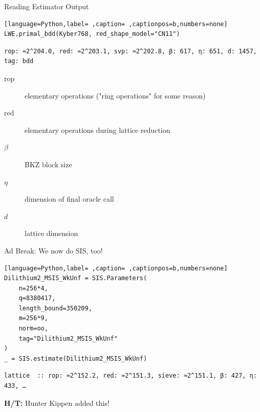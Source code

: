 \documentclass[table,10pt,aspectratio=169]{beamer}
\begin{document}
\begin{frame}[label={sec:org2b87c75},fragile]{Reading Estimator Output}
 \begin{lstlisting}[language=Python,label= ,caption= ,captionpos=b,numbers=none]
LWE.primal_bdd(Kyber768, red_shape_model="CN11")
\end{lstlisting}

\begin{verbatim}
rop: ≈2^204.0, red: ≈2^203.1, svp: ≈2^202.8, β: 617, η: 651, d: 1457, tag: bdd
\end{verbatim}


\begin{description}
\item[{rop}] elementary operations ("ring operations" for some reason)
\item[{red}] elementary operations during lattice reduction
\item[{\(\beta\)}] BKZ block size
\item[{\(\eta\)}] dimension of final oracle call
\item[{\(d\)}] lattice dimension
\end{description}
\end{frame}

\begin{frame}[label={sec:orgede36d3},fragile]{\alert{Ad Break: We now do SIS, too!}}
 \begin{lstlisting}[language=Python,label= ,caption= ,captionpos=b,numbers=none]
Dilithium2_MSIS_WkUnf = SIS.Parameters(
    n=256*4,
    q=8380417,
    length_bound=350209,
    m=256*9,
    norm=oo,
    tag="Dilithium2_MSIS_WkUnf"
)
_ = SIS.estimate(Dilithium2_MSIS_WkUnf)
\end{lstlisting}

\begin{verbatim}
lattice  :: rop: ≈2^152.2, red: ≈2^151.3, sieve: ≈2^151.1, β: 427, η: 433, …
\end{verbatim}


\textbf{H/T:} Hunter Kippen added this!
\end{frame}
\end{document}
